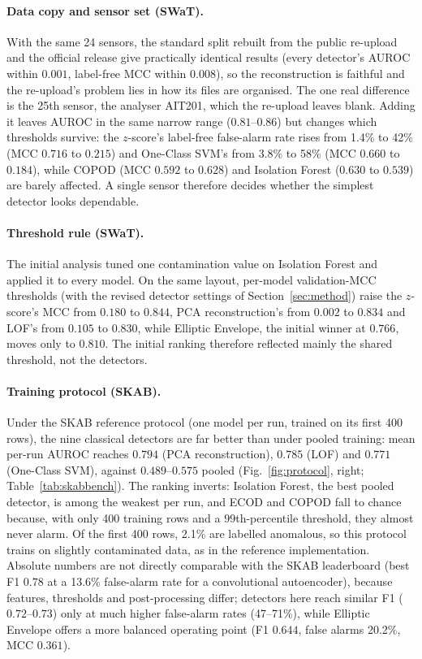 \documentclass[11pt]{article}
\begin{document}
\paragraph{Data copy and sensor set (SWaT).} With the same 24 sensors, the standard
split rebuilt from the public re-upload and the official release give practically
identical results (every detector's AUROC within $0.001$, label-free MCC within $0.008$),
so the reconstruction is faithful and the re-upload's problem lies in how its files are
organised. The one real difference is the 25th sensor, the analyser AIT201, which the
re-upload leaves blank. Adding it leaves AUROC in the same narrow range ($0.81$--$0.86$) but
changes which thresholds survive: the $z$-score's label-free false-alarm rate rises from
1.4\% to 42\% (MCC $0.716$ to $0.215$) and One-Class SVM's from 3.8\% to 58\% (MCC
$0.660$ to $0.184$), while COPOD (MCC $0.592$ to $0.628$) and Isolation Forest ($0.630$ to
$0.539$) are barely affected. A single sensor therefore decides whether the simplest
detector looks dependable.

\paragraph{Threshold rule (SWaT).} The initial analysis tuned one contamination
value on Isolation Forest and applied it to every model. On the same layout,
per-model validation-MCC thresholds (with the revised detector settings of
Section~\ref{sec:method}) raise the $z$-score's MCC from $0.180$ to
$0.844$, PCA reconstruction's from $0.002$ to $0.834$ and LOF's from $0.105$ to
$0.830$, while Elliptic Envelope, the initial winner at $0.766$, moves only to
$0.810$. The initial ranking therefore reflected mainly the shared threshold,
not the detectors.

\paragraph{Training protocol (SKAB).} Under the SKAB reference protocol (one
model per run, trained on its first 400 rows), the nine classical detectors are far
better than under pooled training: mean per-run AUROC reaches $0.794$
(PCA reconstruction), $0.785$ (LOF) and $0.771$ (One-Class SVM), against
$0.489$--$0.575$ pooled (Fig.~\ref{fig:protocol}, right; Table~\ref{tab:skabbench}).
The ranking inverts: Isolation Forest, the best pooled detector, is among the
weakest per run, and ECOD and COPOD fall to chance because, with only 400 training
rows and a 99th-percentile threshold, they almost never alarm. Of the first 400
rows, 2.1\% are labelled anomalous, so this protocol trains on slightly
contaminated data, as in the reference implementation. Absolute numbers are not
directly comparable with the SKAB leaderboard (best F1 $0.78$ at a 13.6\% false-alarm
rate for a convolutional autoencoder), because features, thresholds and post-processing
differ; detectors here reach similar F1 ($0.72$--$0.73$) only at much higher
false-alarm rates (47--71\%), while Elliptic Envelope offers a more balanced
operating point (F1 $0.644$, false alarms 20.2\%, MCC $0.361$).
\end{document}
